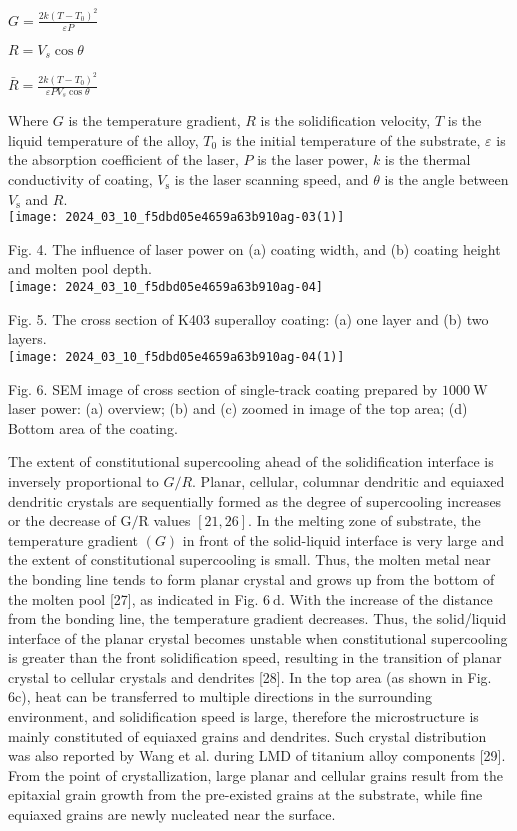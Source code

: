 \documentclass[10pt]{article}
\begin{document}
$G=\frac{2 k\left(T-T_{0}\right)^{2}}{\varepsilon P}$

$R=V_{s} \cos \theta$

$\bar{R}=\frac{2 k\left(T-T_{0}\right)^{2}}{\varepsilon P V_{s} \cos \theta}$

Where $G$ is the temperature gradient, $R$ is the solidification velocity, $T$ is the liquid temperature of the alloy, $T_{0}$ is the initial temperature of the substrate, $\varepsilon$ is the absorption coefficient of the laser, $P$ is the laser power, $k$ is the thermal conductivity of coating, $V_{\mathrm{s}}$ is the laser scanning speed, and $\theta$ is the angle between $V_{\mathrm{s}}$ and $R$.\\
\texttt{[image: 2024\_03\_10\_f5dbd05e4659a63b910ag-03(1)]}

Fig. 4. The influence of laser power on (a) coating width, and (b) coating height and molten pool depth.\\
\texttt{[image: 2024\_03\_10\_f5dbd05e4659a63b910ag-04]}

Fig. 5. The cross section of K403 superalloy coating: (a) one layer and (b) two layers.\\
\texttt{[image: 2024\_03\_10\_f5dbd05e4659a63b910ag-04(1)]}

Fig. 6. SEM image of cross section of single-track coating prepared by $1000 \mathrm{~W}$ laser power: (a) overview; (b) and (c) zoomed in image of the top area; (d) Bottom area of the coating.

The extent of constitutional supercooling ahead of the solidification interface is inversely proportional to $G / R$. Planar, cellular, columnar dendritic and equiaxed dendritic crystals are sequentially formed as the degree of supercooling increases or the decrease of $\mathrm{G} / \mathrm{R}$ values $[21,26]$. In the melting zone of substrate, the temperature gradient $(G)$ in front of the solid-liquid interface is very large and the extent of constitutional supercooling is small. Thus, the molten metal near the bonding line tends to form planar crystal and grows up from the bottom of the molten pool [27], as indicated in Fig. $6 \mathrm{~d}$. With the increase of the distance from the bonding line, the temperature gradient decreases. Thus, the solid/liquid interface of the planar crystal becomes unstable when constitutional supercooling is greater than the front solidification speed, resulting in the transition of planar crystal to cellular crystals and dendrites [28]. In the top area (as shown in Fig. 6c), heat can be transferred to multiple directions in the surrounding environment, and solidification speed is large, therefore the microstructure is mainly constituted of equiaxed grains and dendrites. Such crystal distribution was also reported by Wang et al. during LMD of titanium alloy components [29]. From the point of crystallization, large planar and cellular grains result from the epitaxial grain growth from the pre-existed grains at the substrate, while fine equiaxed grains are newly nucleated near the surface.
\end{document}

